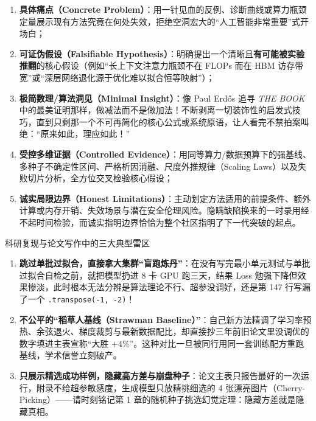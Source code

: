 \begin{enumerate}
  \item \textbf{具体痛点（Concrete Problem）}：用一针见血的反例、诊断曲线或算力瓶颈定量展示现有方法究竟在何处失效，拒绝空洞宏大的“人工智能非常重要”式开场白；
  \item \textbf{可证伪假设（Falsifiable Hypothesis）}：明确提出一个清晰且\textbf{有可能被实验推翻}的核心假设（例如“长上下文注意力瓶颈不在 FLOPs 而在 HBM 访存带宽”或“深层网络退化源于优化难以拟合恒等映射”）；
  \item \textbf{极简数理/算法洞见（Minimal Insight）}：像 Paul Erdős 追寻 \emph{THE BOOK} 中的最美证明那样，做减法而不是做加法！不断剥离一切装饰性的启发式技巧，直到只剩那一个不可再简化的核心公式或系统原语，让人看完不禁拍案叫绝：“原来如此，理应如此！”
  \item \textbf{受控多维证据（Controlled Evidence）}：用同等算力/数据预算下的强基线、多种子不确定性区间、严格析因消融、尺度外推规律（Scaling Laws）以及失败切片分析，全方位交叉检验核心假设；
  \item \textbf{诚实局限边界（Honest Limitations）}：主动划定方法适用的前提条件、额外计算或内存开销、失效场景与潜在安全伦理风险。隐瞒缺陷换来的一时录用经不起时间检验，而诚实指明边界恰恰为整个社区指明了下一代突破的起点。
\end{enumerate}

\begin{failBox}{科研复现与论文写作中的三大典型雷区}
\begin{enumerate}
  \item \textbf{跳过单批过拟合，直接拿大集群“盲跑炼丹”}：在没有写完最小单元测试与单批过拟合自检之前，就把模型扔进 8 卡 GPU 跑三天，结果 Loss 勉强下降但效果惨淡，此时根本无法分辨是算法理论不行、超参没调好，还是第 147 行写漏了一个 \texttt{.transpose(-1, -2)}！
  \item \textbf{不公平的“稻草人基线（Strawman Baseline）”}：自己新方法精调了学习率预热、余弦退火、梯度裁剪与最新数据配比，却直接抄三年前旧论文里没调优的数字填进主表宣称“大胜 $+4\%$”。这种对比一旦被同行用同一套训练配方重跑基线，学术信誉立刻破产。
  \item \textbf{只展示精选成功样例，隐藏高方差与崩盘种子}：论文主表只报告最好的一次运行，附录不给超参敏感度，生成模型只放精挑细选的 4 张漂亮图片（Cherry-Picking）——请时刻铭记第 1 章的随机种子挑选幻觉定理：隐藏方差就是隐藏真相。
\end{enumerate}
\end{failBox}

